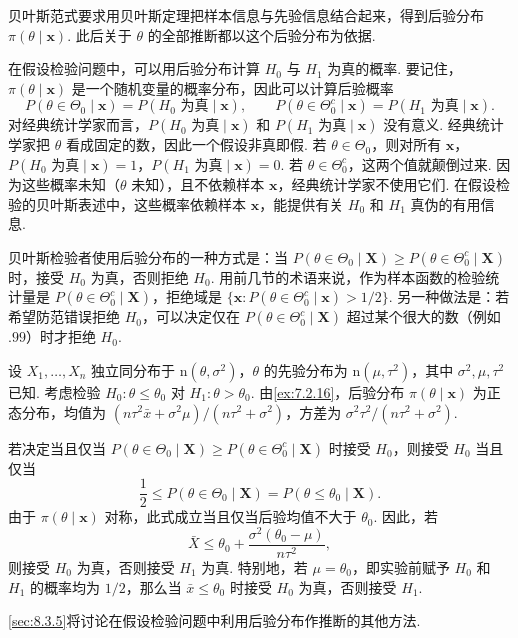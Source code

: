 贝叶斯范式要求用贝叶斯定理把样本信息与先验信息结合起来，得到后验分布 $\pi(\theta\mid\boldsymbol x)$. 此后关于 $\theta$ 的全部推断都以这个后验分布为依据.

在假设检验问题中，可以用后验分布计算 $H_0$ 与 $H_1$ 为真的概率. 要记住，$\pi(\theta\mid\boldsymbol x)$ 是一个随机变量的概率分布，因此可以计算后验概率
$$P(\theta\in\Theta_0\mid\boldsymbol x)=P(H_0\text{ 为真}\mid\boldsymbol x),\qquad
P(\theta\in\Theta_0^c\mid\boldsymbol x)=P(H_1\text{ 为真}\mid\boldsymbol x).$$
对经典统计学家而言，$P(H_0\text{ 为真}\mid\boldsymbol x)$ 和 $P(H_1\text{ 为真}\mid\boldsymbol x)$ 没有意义. 经典统计学家把 $\theta$ 看成固定的数，因此一个假设非真即假. 若 $\theta\in\Theta_0$，则对所有 $\boldsymbol x$，$P(H_0\text{ 为真}\mid\boldsymbol x)=1$，$P(H_1\text{ 为真}\mid\boldsymbol x)=0$. 若 $\theta\in\Theta_0^c$，这两个值就颠倒过来. 因为这些概率未知（$\theta$ 未知），且不依赖样本 $\boldsymbol x$，经典统计学家不使用它们. 在假设检验的贝叶斯表述中，这些概率依赖样本 $\boldsymbol x$，能提供有关 $H_0$ 和 $H_1$ 真伪的有用信息.

贝叶斯检验者使用后验分布的一种方式是：当 $P(\theta\in\Theta_0\mid\boldsymbol X)\ge P(\theta\in\Theta_0^c\mid\boldsymbol X)$ 时，接受 $H_0$ 为真，否则拒绝 $H_0$. 用前几节的术语来说，作为样本函数的检验统计量是 $P(\theta\in\Theta_0^c\mid\boldsymbol X)$，拒绝域是 $\{\boldsymbol x:P(\theta\in\Theta_0^c\mid\boldsymbol x)>1/2\}$. 另一种做法是：若希望防范错误拒绝 $H_0$，可以决定仅在 $P(\theta\in\Theta_0^c\mid\boldsymbol X)$ 超过某个很大的数（例如 $.99$）时才拒绝 $H_0$.
\begin{example}[正态总体的贝叶斯检验]\label{ex:8.2.7}
设 $X_1,\ldots,X_n$ 独立同分布于 $\mathrm n(\theta,\sigma^2)$，$\theta$ 的先验分布为 $\mathrm n(\mu,\tau^2)$，其中 $\sigma^2,\mu,\tau^2$ 已知. 考虑检验 $H_0:\theta\le\theta_0$ 对 $H_1:\theta>\theta_0$. 由\autoref{ex:7.2.16}，后验分布 $\pi(\theta\mid\boldsymbol x)$ 为正态分布，均值为 $(n\tau^2\bar x+\sigma^2\mu)/(n\tau^2+\sigma^2)$，方差为 $\sigma^2\tau^2/(n\tau^2+\sigma^2)$.

若决定当且仅当 $P(\theta\in\Theta_0\mid\boldsymbol X)\ge P(\theta\in\Theta_0^c\mid\boldsymbol X)$ 时接受 $H_0$，则接受 $H_0$ 当且仅当
$$\frac12\le P(\theta\in\Theta_0\mid\boldsymbol X)=P(\theta\le\theta_0\mid\boldsymbol X).$$
由于 $\pi(\theta\mid\boldsymbol x)$ 对称，此式成立当且仅当后验均值不大于 $\theta_0$. 因此，若
$$\bar X\le\theta_0+\frac{\sigma^2(\theta_0-\mu)}{n\tau^2},$$
则接受 $H_0$ 为真，否则接受 $H_1$ 为真. 特别地，若 $\mu=\theta_0$，即实验前赋予 $H_0$ 和 $H_1$ 的概率均为 $1/2$，那么当 $\bar x\le\theta_0$ 时接受 $H_0$ 为真，否则接受 $H_1$.
\end{example}
\autoref{sec:8.3.5}将讨论在假设检验问题中利用后验分布作推断的其他方法.

